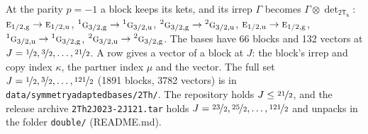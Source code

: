 \documentclass[10pt,a4paper]{article}
\numberwithin{equation}{section}
\newcommand{\grp}[1]{\mathsf{#1}}
\newcommand{\irr}[1]{\text{\normalfont\scshape #1}}
\newcommand{\conjpair}[1]{{}^{#1}}
\newcommand{\ptag}[1]{\mathrm{#1}}
\newcommand{\irrprod}{\otimes}
\newcommand{\mult}{\kappa}
\newcommand{\intx}{\mu}
\begin{document}
At the parity $p = -1$ a block keeps its kets, and its irrep $\Gamma$ becomes $\Gamma \irrprod \det_{\grp{2T_{h}}}$: $\irr{e}_{1/2,\ptag{g}} \to \irr{e}_{1/2,\ptag{u}}$, $\conjpair{1}\irr{g}_{3/2,\ptag{g}} \to \conjpair{1}\irr{g}_{3/2,\ptag{u}}$, $\conjpair{2}\irr{g}_{3/2,\ptag{g}} \to \conjpair{2}\irr{g}_{3/2,\ptag{u}}$, $\irr{e}_{1/2,\ptag{u}} \to \irr{e}_{1/2,\ptag{g}}$, $\conjpair{1}\irr{g}_{3/2,\ptag{u}} \to \conjpair{1}\irr{g}_{3/2,\ptag{g}}$, $\conjpair{2}\irr{g}_{3/2,\ptag{u}} \to \conjpair{2}\irr{g}_{3/2,\ptag{g}}$.
The bases have 66 blocks and 132 vectors at $J = \nicefrac{1}{2}, \nicefrac{3}{2}, \dots, \nicefrac{21}{2}$. \label{n:head.vector}A row gives a vector of a block at $J$: the block's irrep and copy index $\mult$, the partner index $\intx$ and the vector. The full set $J = \nicefrac{1}{2}, \nicefrac{3}{2}, \dots, \nicefrac{121}{2}$ (1891 blocks, 3782 vectors) is in \texttt{data/symmetryadaptedbases/2Th/}. The repository holds $J \le \nicefrac{21}{2}$, and the release archive \texttt{2Th2J023-2J121.tar} holds $J = \nicefrac{23}{2}, \nicefrac{25}{2}, \dots, \nicefrac{121}{2}$ and unpacks in the folder \texttt{double/} (README.md).
\end{document}
